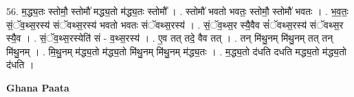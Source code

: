 \documentclass[17pt]{extarticle}
\begin{document}
56. म॒द्ध्य॒तः स्तोमौ॒ स्तोमौ॑ मद्ध्य॒तो म॑द्ध्य॒तः स्तोमौ᳚ । . स्तोमौ॑ भवतो भवतः॒ स्तोमौ॒ स्तोमौ॑ भवतः । . भ॒व॒तः॒ सं॒ॅव॒थ्स॒रस्य॑ संॅवथ्स॒रस्य॑ भवतो भवतः संॅवथ्स॒रस्य॑ । . सं॒ॅव॒थ्स॒र स्यै॒वैव सं॑ॅवथ्स॒रस्य॑ संॅवथ्स॒र स्यै॒व । . सं॒ॅव॒थ्स॒रस्येति॑ सं - व॒थ्स॒रस्य॑ । . ए॒व तत् तदे॒ वैव तत् । . तन् मि॑थु॒नम् मि॑थु॒नम् तत् तन् मि॑थु॒नम् । . मि॒थु॒नम् म॑द्ध्य॒तो म॑द्ध्य॒तो मि॑थु॒नम् मि॑थु॒नम् म॑द्ध्य॒तः । . म॒द्ध्य॒तो द॑धति दधति मद्ध्य॒तो म॑द्ध्य॒तो द॑धति । \newline

\textbf{Ghana Paata } \newline
\end{document}
